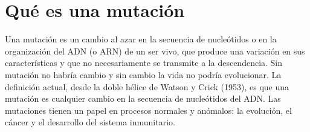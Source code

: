 \documentclass{book}
\begin{document}

\section{Qué es una mutación}

Una mutación es un cambio al azar en la secuencia de nucleótidos o en la organización del ADN (o ARN) de un ser vivo, que produce una variación en sus características y que no necesariamente se transmite a la descendencia. Sin mutación no habría cambio y sin cambio la vida no podría evolucionar. La definición actual, desde la doble hélice de Watson y Crick (1953), es que una mutación es cualquier cambio en la secuencia de nucleótidos del ADN. Las mutaciones tienen un papel en procesos normales y anómalos: la evolución, el cáncer y el desarrollo del sistema inmunitario.

\end{document}
